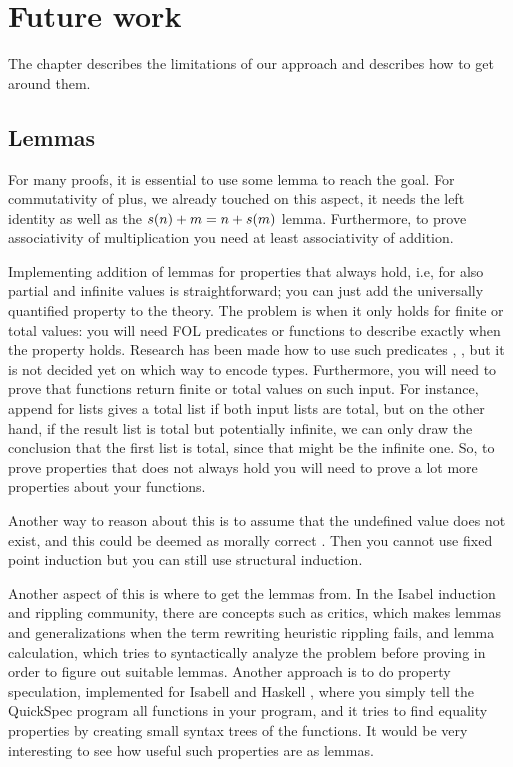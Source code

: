 \chapter{Future work}

The chapter describes the limitations of our approach and describes
how to get around them.

\section{Lemmas}

For many proofs, it is essential to use some lemma to reach the
goal. For commutativity of plus, we already touched on this aspect, it
needs the left identity as well as the $s(n) + m = n + s(m)$
lemma. Furthermore, to prove associativity of multiplication you need
at least associativity of addition.

Implementing addition of lemmas for properties that always hold, i.e,
for also partial and infinite values is straightforward; you can just
add the universally quantified property to the theory. The problem is
when it only holds for finite or total values: you will need FOL
predicates or functions to describe exactly when the property
holds. Research has been made how to use such predicates
\cite{sortMonotonicity}, \cite{polyMonotonicity}, but it is not
decided yet on which way to encode types. Furthermore, you will need
to prove that functions return finite or total values on such
input. For instance, append for lists gives a total list if both input
lists are total, but on the other hand, if the result list is total
but potentially infinite, we can only draw the conclusion that the
first list is total, since that might be the infinite one. So, to
prove properties that does not always hold you will need to prove a
lot more properties about your functions.

Another way to reason about this is to assume that the undefined value
does not exist, and this could be deemed as morally correct
\cite{fastandloose}. Then you cannot use fixed point induction but you
can still use structural induction.

Another aspect of this is where to get the lemmas from. In the Isabel
induction and rippling community, there are concepts such as critics,
which makes lemmas and generalizations when the term rewriting
heuristic rippling fails, and lemma calculation, which tries to
syntactically analyze the problem before proving in order to figure
out suitable lemmas. Another approach is to do property speculation,
implemented for Isabell \cite{isacosy} and Haskell \cite{quickspec},
where you simply tell the QuickSpec program all functions in your
program, and it tries to find equality properties by creating small syntax
trees of the functions. It would be very interesting to see how useful
such properties are as lemmas.

